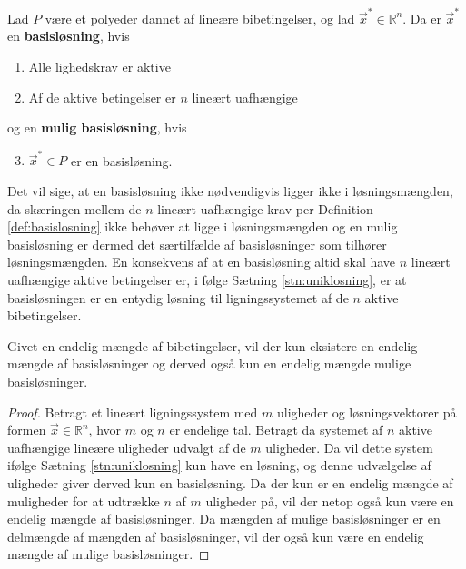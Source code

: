 \begin{defn}
Lad $P$ være et polyeder dannet af lineære bibetingelser, og lad $\vec{x}^*\in \mathds{R}^n$. Da er $\vec{x}^*$ en \textbf{basisløsning}, hvis
\begin{enumerate}[label=(\alph*)]
\item Alle lighedskrav er aktive
\item Af de aktive betingelser er $n$ lineært uafhængige
\end{enumerate}
og en \textbf{mulig basisløsning}, hvis
\begin{enumerate}[label=(\alph*)]
\setcounter{enumi}{2}
\item $\vec{x}^* \in P$ er en basisløsning.
\end{enumerate}
\label{def:basislosning}
\end{defn}
Det vil sige, at en basisløsning ikke nødvendigvis ligger ikke i løsningsmængden, da skæringen mellem de $n$ lineært uafhængige krav  per Definition \ref{def:basislosning} ikke behøver at ligge i løsningsmængden og en mulig basisløsning er dermed det særtilfælde af basisløsninger som tilhører løsningsmængden.
En konsekvens af at en basisløsning altid skal have $n$ lineært uafhængige aktive betingelser er, i følge Sætning \ref{stn:uniklosning}, er at basisløsningen er en entydig løsning til ligningssystemet af de $n$ aktive bibetingelser.

\begin{kor}
Givet en endelig mængde af bibetingelser, vil der kun eksistere en endelig mængde af basisløsninger og derved også kun en endelig mængde mulige basisløsninger.
\label{kor:endeligbasis}
\end{kor}

\begin{proof}
Betragt et lineært ligningssystem med $m$ uligheder og løsningsvektorer på formen $\vec{x} \in \mathds{R}^n$, hvor $m$ og $n$ er endelige tal.
	Betragt da systemet af $n$ aktive uafhængige lineære uligheder udvalgt af de $m$ uligheder. Da vil dette system ifølge Sætning \ref{stn:uniklosning} kun have en løsning, og denne udvælgelse af uligheder giver derved kun en basisløsning. Da der kun er en endelig mængde af muligheder for at udtrække $n$ af $m$ uligheder på, vil der netop også kun være en endelig mængde af basisløsninger. Da mængden af mulige basisløsninger er en delmængde af mængden af basisløsninger, vil der også kun være en endelig mængde af mulige basisløsninger.
\end{proof}

